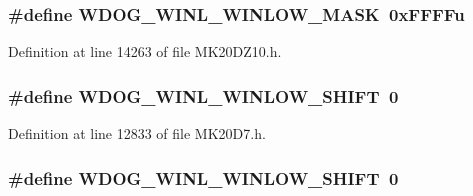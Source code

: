 \subsubsection[{\texorpdfstring{W\+D\+O\+G\+\_\+\+W\+I\+N\+L\+\_\+\+W\+I\+N\+L\+O\+W\+\_\+\+M\+A\+SK}{WDOG_WINL_WINLOW_MASK}}]{\setlength{\rightskip}{0pt plus 5cm}\#define W\+D\+O\+G\+\_\+\+W\+I\+N\+L\+\_\+\+W\+I\+N\+L\+O\+W\+\_\+\+M\+A\+SK~0x\+F\+F\+F\+Fu}\hypertarget{group___w_d_o_g___register___masks_gadc36bfdccd5e9c14d063a5b36b6a3f6a}{}\label{group___w_d_o_g___register___masks_gadc36bfdccd5e9c14d063a5b36b6a3f6a}


Definition at line 14263 of file M\+K20\+D\+Z10.\+h.

\subsubsection[{\texorpdfstring{W\+D\+O\+G\+\_\+\+W\+I\+N\+L\+\_\+\+W\+I\+N\+L\+O\+W\+\_\+\+S\+H\+I\+FT}{WDOG_WINL_WINLOW_SHIFT}}]{\setlength{\rightskip}{0pt plus 5cm}\#define W\+D\+O\+G\+\_\+\+W\+I\+N\+L\+\_\+\+W\+I\+N\+L\+O\+W\+\_\+\+S\+H\+I\+FT~0}\hypertarget{group___w_d_o_g___register___masks_ga7f2baf848e4bfe9b0143d073467d1c1a}{}\label{group___w_d_o_g___register___masks_ga7f2baf848e4bfe9b0143d073467d1c1a}


Definition at line 12833 of file M\+K20\+D7.\+h.

\subsubsection[{\texorpdfstring{W\+D\+O\+G\+\_\+\+W\+I\+N\+L\+\_\+\+W\+I\+N\+L\+O\+W\+\_\+\+S\+H\+I\+FT}{WDOG_WINL_WINLOW_SHIFT}}]{\setlength{\rightskip}{0pt plus 5cm}\#define W\+D\+O\+G\+\_\+\+W\+I\+N\+L\+\_\+\+W\+I\+N\+L\+O\+W\+\_\+\+S\+H\+I\+FT~0}\hypertarget{group___w_d_o_g___register___masks_ga7f2baf848e4bfe9b0143d073467d1c1a}{}\label{group___w_d_o_g___register___masks_ga7f2baf848e4bfe9b0143d073467d1c1a}


